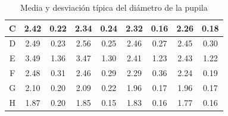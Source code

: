 \begin{table}[htb]
\begin{tabular}{@{}cccccccccll@{}}
{C}                                  & \cellcolor[HTML]{BDD6EE}2.42 & \multicolumn{1}{c|}{\cellcolor[HTML]{BDD6EE}0.22} & \cellcolor[HTML]{BDD6EE}2.34 & \multicolumn{1}{c|}{\cellcolor[HTML]{BDD6EE}0.24} & 2.32                         & \multicolumn{1}{c|}{0.16}                         & 2.26                          & \multicolumn{3}{c}{0.18}                         \\ \midrule
{D}                                  & \cellcolor[HTML]{BDD6EE}2.49 & \multicolumn{1}{c|}{\cellcolor[HTML]{BDD6EE}0.23} & \cellcolor[HTML]{BDD6EE}2.56 & \multicolumn{1}{c|}{\cellcolor[HTML]{BDD6EE}0.25} & 2.46                         & \multicolumn{1}{c|}{0.27}                         & 2.45                          & \multicolumn{3}{c}{0.30}                         \\ \midrule
{E}                                  & \cellcolor[HTML]{BDD6EE}3.49 & \multicolumn{1}{c|}{\cellcolor[HTML]{BDD6EE}1.36} & \cellcolor[HTML]{BDD6EE}3.47 & \multicolumn{1}{c|}{\cellcolor[HTML]{BDD6EE}1.30} & 2.41                         & \multicolumn{1}{c|}{1.23}                         & 2.43                          & \multicolumn{3}{c}{1.22}                         \\ \midrule
{F}                                  & \cellcolor[HTML]{BDD6EE}2.48 & \multicolumn{1}{c|}{\cellcolor[HTML]{BDD6EE}0.31} & \cellcolor[HTML]{BDD6EE}2.46 & \multicolumn{1}{c|}{\cellcolor[HTML]{BDD6EE}0.29} & 2.29                         & \multicolumn{1}{c|}{0.36}                         & 2.24                          & \multicolumn{3}{c}{0.19}                         \\ \midrule
G                                           & \cellcolor[HTML]{BDD6EE}2.10 & \multicolumn{1}{c|}{\cellcolor[HTML]{BDD6EE}0.20} & \cellcolor[HTML]{BDD6EE}2.09 & \multicolumn{1}{c|}{\cellcolor[HTML]{BDD6EE}0.22} & 1.96                         & \multicolumn{1}{c|}{0.17}                         & 1.96                          & \multicolumn{3}{c}{0.17}                         \\ \midrule
H                                           & \cellcolor[HTML]{BDD6EE}1.87 & \multicolumn{1}{c|}{\cellcolor[HTML]{BDD6EE}0.20} & \cellcolor[HTML]{BDD6EE}1.85 & \multicolumn{1}{c|}{\cellcolor[HTML]{BDD6EE}0.15} & 1.83                         & \multicolumn{1}{c|}{0.16}                         & 1.77                          & \multicolumn{3}{c}{0.16}                        
\end{tabular}
\caption{Media y desviación típica del diámetro de la pupila}
\label{tab:3.3}
\end{table}

